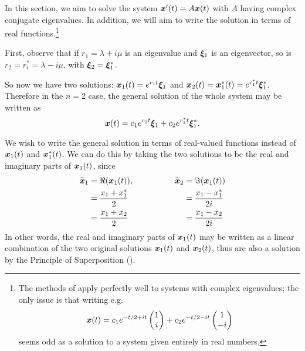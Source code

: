 In this section, we aim to solve the system $\bm{x}'(t) = A\bm{x}(t)$ with $A$ having complex conjugate eigenvalues. In addition, we will aim to write the solution in terms of real functions.\footnote{The methods of  apply perfectly well to systems with complex eigenvalues; the only issue is that writing e.g. \[\bm{x}(t) = c_1 e^{-t/2 + it}\begin{pmatrix}1 \\ i\end{pmatrix} + c_2 e^{-t/2 - it}\begin{pmatrix}1 \\ -i\end{pmatrix}\] seems odd as a solution to a system given entirely in real numbers.}

First, observe that if $r_1 = \lambda + i\mu$ is an eigenvalue and $\bm{\xi}_1$ is an eigenvector, so is $r_2 = r_i^* = \lambda - i\mu$, with $\bm{\xi}_2 = \bm{\xi}_1^*$.

So now we have two solutions: $\bm{x}_1(t) = e^{r_1t} \bm{\xi}_1$ and $\bm{x}_2(t) = \bm{x}_1^*(t) = e^{r_1^*t} \bm{\xi}_1^*$. Therefore in the $n=2$ case, the general solution of the whole system may be written as
\begin{equation*}\label{eq:complexgen}
	\bm{x}(t) = c_1 e^{r_1t} \bm{\xi}_1 + c_2 e^{r_1^*t} \bm{\xi}_1^*.
\end{equation*}

We wish to write the general solution in terms of real-valued functions instead of $\bm{x}_1(t)$ and $\bm{x}_1^*(t)$. We can do this by taking the two solutions to be the real and imaginary parts of $\bm{x}_1(t)$, since
\begin{equation*}
	\begin{alignedat}{2}
		\widetilde{\bm{x}}_1 &= \Re(\bm{x}_1(t)), \hspace{50pt} \widetilde{\bm{x}}_2 &&= \Im(\bm{x}_1(t)) \\
		&= \frac{x_1 + x_1^*}{2} &&= \frac{x_1 - x_1^*}{2i} \\
		&= \frac{x_1 + x_2}{2} &&= \frac{x_1 - x_2}{2i}
	\end{alignedat}
\end{equation*}
In other words, the real and imaginary parts of $\bm{x}_1(t)$ may be written as a linear combination of the two original solutions $\bm{x}_1(t)$ and $\bm{x}_2(t)$, thus are also a solution by the Principle of Superposition ().

